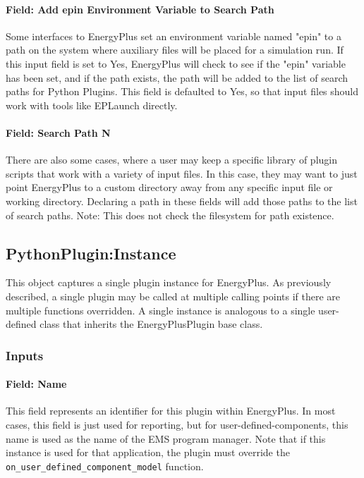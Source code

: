 \paragraph{Field: Add epin Environment Variable to Search Path}

Some interfaces to EnergyPlus set an environment variable named "epin" to a path on the system where auxiliary files will be placed for a simulation run.
If this input field is set to Yes, EnergyPlus will check to see if the "epin" variable has been set, and if the path exists, the path will be added to the list of search paths for Python Plugins.
This field is defaulted to Yes, so that input files should work with tools like EPLaunch directly.

\paragraph{Field: Search Path N}

There are also some cases, where a user may keep a specific library of plugin scripts that work with a variety of input files.
In this case, they may want to just point EnergyPlus to a custom directory away from any specific input file or working directory.
Declaring a path in these fields will add those paths to the list of search paths.
Note: This does not check the filesystem for path existence.

\subsection{PythonPlugin:Instance}

This object captures a single plugin instance for EnergyPlus.
As previously described, a single plugin may be called at multiple calling points if there are multiple functions overridden.
A single instance is analogous to a single user-defined class that inherits the EnergyPlusPlugin base class.

\subsubsection{Inputs}

\paragraph{Field: Name}

This field represents an identifier for this plugin within EnergyPlus.
In most cases, this field is just used for reporting, but for user-defined-components, this name is used as the name of the EMS program manager.
Note that if this instance is used for that application, the plugin must override the \verb=on_user_defined_component_model= function.

